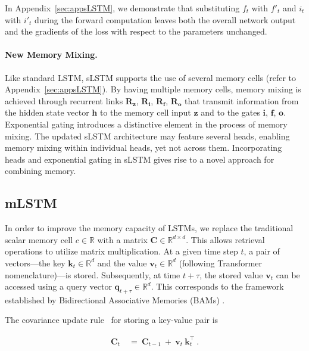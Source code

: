 In Appendix~\ref{sec:appsLSTM}, we demonstrate that substituting $f_t$ with $f'_t$ and $i_t$ with $i'_t$ during the forward computation leaves both the overall network output and the gradients of the loss with respect to the parameters unchanged.

\paragraph{New Memory Mixing.} Like standard LSTM, sLSTM supports the use of several memory cells (refer to Appendix~\ref{sec:appsLSTM}). By having multiple memory cells, memory mixing is achieved through recurrent links $\mathbf{R}_{\mathbf{z}}$, $\mathbf{R}_{\mathbf{i}}$, $\mathbf{R}_{\mathbf{f}}$, $\mathbf{R}_{\mathbf{o}}$ that transmit information from the hidden state vector $\mathbf{h}$ to the memory cell input $\mathbf{z}$ and to the gates $\mathbf{i}$, $\mathbf{f}$, $\mathbf{o}$. Exponential gating introduces a distinctive element in the process of memory mixing. The updated sLSTM architecture may feature several heads, enabling memory mixing within individual heads, yet not across them. Incorporating heads and exponential gating in sLSTM gives rise to a novel approach for combining memory.

\subsection{mLSTM}
\label{sec:mLSTM}

In order to improve the memory capacity of LSTMs, we replace the traditional scalar memory cell $c \in \mathbb{R}$ with a matrix $\mathbf{C} \in \mathbb{R}^{d \times d}$. This allows retrieval operations to utilize matrix multiplication. At a given time step $t$, a pair of vectors—the key $\mathbf{k}_t \in \mathbb{R}^d$ and the value $\mathbf{v}_t \in \mathbb{R}^d$ (following Transformer nomenclature)—is stored. Subsequently, at time $t + \tau$, the stored value $\mathbf{v}_t$ can be accessed using a query vector $\mathbf{q}_{t+\tau} \in \mathbb{R}^d$. This corresponds to the framework established by Bidirectional Associative Memories (BAMs) \citep{Kohonen:72,Anderson:72,Nakano:72,Anderson:77}.

The covariance update rule~\citep{Sejnowski:77,Dayan:91} for storing a key-value pair is

\begin{align}
\mathbf{C}_t \ &= \ \mathbf{C}_{t-1} \ + \ \mathbf{v}_{t} \ \mathbf{k}_t^\top \ .
\end{align}

